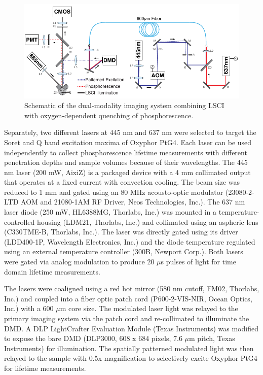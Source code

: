 \begin{figure}
    \includegraphics{figures/chapter_2/systemschematic.pdf}
    \caption{
        \label{fig:systemschematic_1}
        Schematic of the dual-modality imaging system combining LSCI with oxygen-dependent quenching of phosphorescence.
    }
\end{figure}

Separately, two different lasers at 445 nm and 637 nm were selected to target the Soret and Q band excitation maxima of Oxyphor PtG4. Each laser can be used independently to collect phosphorescence lifetime measurements with different penetration depths and sample volumes because of their wavelengths. The 445 nm laser (200 mW, AixiZ) is a packaged device with a 4 mm collimated output that operates at a fixed current with convection cooling. The beam size was reduced to 1 mm and gated using an 80 MHz acousto-optic modulator (23080-2-LTD AOM and 21080-1AM RF Driver, Neos Technologies, Inc.). The 637 nm laser diode (250 mW, HL6388MG, Thorlabs, Inc.) was mounted in a temperature-controlled housing (LDM21, Thorlabs, Inc.) and collimated using an aspheric lens (C330TME-B, Thorlabs, Inc.). The laser was directly gated using its driver (LDD400-1P, Wavelength Electronics, Inc.) and the diode temperature regulated using an external temperature controller (300B, Newport Corp.). Both lasers were gated via analog modulation to produce 20 $\mu$s pulses of light for time domain lifetime measurements.

The lasers were coaligned using a red hot mirror (580 nm cutoff, FM02, Thorlabs, Inc.) and coupled into a fiber optic patch cord (P600-2-VIS-NIR, Ocean Optics, Inc.) with a 600 $\mu$m core size. The modulated laser light was relayed to the primary imaging system via the patch cord and re-collimated to illuminate the DMD. A DLP LightCrafter Evaluation Module (Texas Instruments) was modified to expose the bare DMD (DLP3000, 608 x 684 pixels, 7.6 $\mu$m pitch, Texas Instruments) for illumination. The spatially patterned modulated light was then relayed to the sample with 0.5x magnification to selectively excite Oxyphor PtG4 for lifetime measurements.

